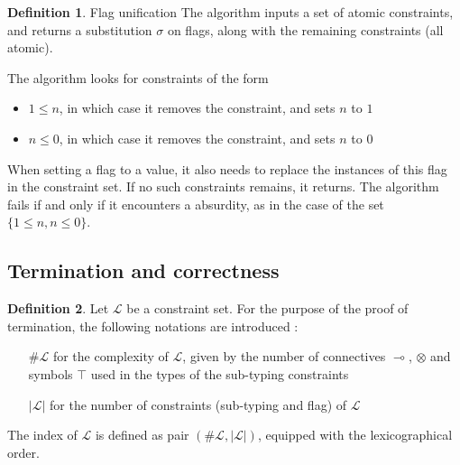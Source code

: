 \documentclass[10pt]{article}
\theoremstyle{plain}
\theoremstyle{definition}
\newtheorem{defn}{Definition}[subsection] %
\begin{document}
\begin{defn}{Flag unification}
	The algorithm inputs a set of atomic constraints, and returns a substitution $\sigma$ on flags, along with
	the remaining constraints (all atomic).
	
	The algorithm looks for constraints of the form
	\begin{itemize}
		\item $1 \le n$, in which case it removes the constraint, and sets $n$ to $1$
		\item $n \le 0$, in which case it removes the constraint, and sets $n$ to $0$
	\end{itemize}	
	When setting a flag to a value, it also needs to replace the instances of this flag in the constraint set.
	If no such constraints remains, it returns. The algorithm fails if and only if it encounters a absurdity,
	as in the case of the set $\{ 1 \le n, n \le 0 \}$.
\end{defn}

\subsection{Termination and correctness}

\begin{defn} Let $\mathcal{L}$ be a constraint set. For the purpose of the proof of termination, the following notations are introduced :
	\begin{itemize}
		\item[$\#\mathcal{L}$] for the complexity of $\mathcal{L}$, given by the number of connectives $\multimap$,
			$\otimes$ and symbols $\top$ used in the types of the sub-typing constraints
		\item[$|\mathcal{L}|$] for the number of constraints (sub-typing and flag) of $\mathcal{L}$
	\end{itemize}
	The index of $\mathcal{L}$ is defined as pair $(\#\mathcal{L}, |\mathcal{L}|)$, equipped with the lexicographical order.
\end{defn}
\end{document}
